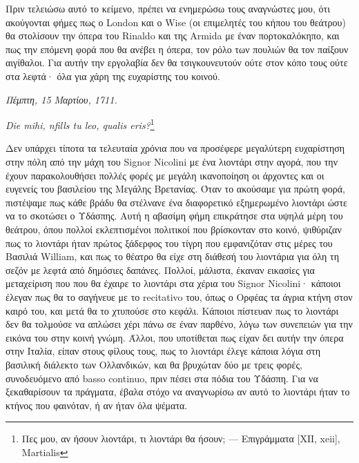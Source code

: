 Πριν τελειώσω αυτό το κείμενο, πρέπει να ενημερώσω τους αναγνώστες μου, ότι ακούγονται φήμες πως ο London και ο Wise (οι επιμελητές του κήπου του θεάτρου) θα στολίσουν την όπερα του Rinaldo και της Armida με έναν πορτοκαλόκηπο, και πως την επόμενη φορά που θα ανέβει η όπερα, τον ρόλο των πουλιών θα τον παίξουν αιγίθαλοι. Για αυτήν την εργολαβία δεν θα τσιγκουνευτούν ούτε στον κόπο τους ούτε στα λεφτά· όλα για χάρη της ευχαρίστης του κοινού.

\begin{center}
    \emph{Πέμπτη, 15 Μαρτίου, 1711.}

    \emph{Die mihi, nfills tu leo, qualis eris?}\footnote{Πες μου, αν ήσουν λιοντάρι, τι λιοντάρι θα ήσουν; --- Επιγράμματα [ΧΙΙ, xeii], Martialis}
\end{center}

Δεν υπάρχει τίποτα τα τελευταία χρόνια που να προσέφερε μεγαλύτερη ευχαρίστηση στην πόλη από την μάχη του Signor Nicolini με ένα λιοντάρι στην αγορά, που την έχουν παρακολουθήσει πολλές φορές με μεγάλη ικανοποίηση οι άρχοντες και οι ευγενείς του βασιλείου της Μεγάλης Βρετανίας. Όταν το ακούσαμε για πρώτη φορά, πιστέψαμε πως κάθε βράδυ θα στέλνανε ένα διαφορετικό εξημερωμένο λιοντάρι ώστε να το σκοτώσει ο Υδάσπης. Αυτή η αβασίμη φήμη επικράτησε στα υψηλά μέρη του θεάτρου, όπου πολλοί εκλεπτισμένοι πολιτικοί που βρίσκονταν στο κοινό, ψιθύριζαν πως το λιοντάρι ήταν πρώτος ξάδερφος του τίγρη που εμφανιζόταν στις μέρες του Βασιλιά William, και πως το θέατρο θα είχε στη διάθεσή του λιοντάρια για όλη τη σεζόν με λεφτά από δημόσιες δαπάνες. Πολλοί, μάλιστα, έκαναν εικασίες για μεταχείριση που που θα έχαιρε το λιοντάρι στα χέρια του Signor Nicolini· κάποιοι έλεγαν πως θα το σαγήνευε με το recitativo του, όπως ο Ορφέας τα άγρια κτήνη στον καιρό του, και μετά θα το χτυπούσε στο κεφάλι. Κάποιοι πίστευαν πως το λιοντάρι δεν θα τολμούσε να απλώσει χέρι πάνω σε έναν παρθένο, λόγω των συνεπειών για την εικόνα του στην κοινή γνώμη. Άλλοι, που υποτίθεται πως είχαν δει αυτήν την όπερα στην Ιταλία, είπαν στους φίλους τους, πως το λιοντάρι έλεγε κάποια λόγια στη βασιλική διάλεκτο των Ολλανδικών, και θα βρυχώταν δύο με τρεις φορές, συνοδευόμενο από basso continuo, πριν πέσει στα πόδια του Υδάσπη. Για να ξεκαθαρίσουν τα πράγματα, έβαλα στόχο να αναγνωρίσω αν αυτό το λιοντάρι ήταν το κτήνος που φαινόταν, ή αν ήταν όλα ψέματα. 

